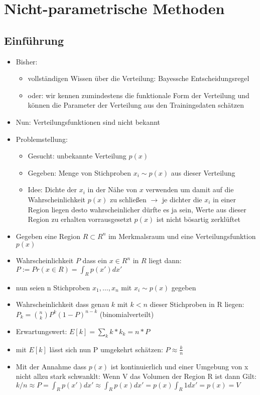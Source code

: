 \documentclass{article} %
\begin{document}
\section{Nicht-parametrische Methoden}
	\subsection{Einführung}
	\begin{itemize}
		\item Bisher:
		\begin{itemize}
			\item vollständigen Wissen über die Verteilung: Bayessche Entscheidungsregel
			\item oder: wir kennen zumindestens die funktionale Form der Verteilung und können die Parameter der Verteilung aus den Trainingsdaten schätzen
		\end{itemize}
		\item Nun: Verteilungsfunktionen sind nicht bekannt
		\item Problemstellung:
		\begin{itemize}
			\item Gesucht: unbekannte Verteilung $p(x)$
			\item Gegeben: Menge von Stichproben $x_i \sim p(x)$ aus dieser Verteilung
			\item Idee: Dichte der $x_i$ in der Nähe von $x$ verwenden um damit auf die Wahrscheinlichkeit $p(x)$ zu schließen $\rightarrow$ je dichter die $x_i$ in einer Region liegen desto wahrscheinlicher dürfte es ja sein, Werte aus dieser Region zu erhalten vorrausgesetzt $p(x)$ ist nicht bösartig zerklüftet
		\end{itemize}
		\item Gegeben eine Region $R \subset R^n$ im Merkmalsraum und eine Verteilungsfunktion $p(x)$
		\item Wahrscheinlichkeit $P$ dass ein $x \in R^n$ in $R$ liegt dann: $P := Pr(x\in R) = \int_R p(x') dx'$
		\item nun seien n Stichproben $x_1,\dots,x_n$ mit $x_i \sim p(x)$ gegeben
		\item Wahrscheinlichkeit dass genau $k$ mit $k<n$ dieser Stichproben in R liegen: $P_k = \binom{n}{k} P^k (1-P)^{n-k}$ (binomialverteilt)
		\item Erwartungswert: $E[k] = \sum_k k*k_k = n*P$
		\item mit $E[k]$ lässt sich nun P umgekehrt schätzen: $P \approx \frac{k}{n}$
		\item Mit der Annahme dass $p(x)$ ist kontinuierlich und einer Umgebung von x nicht allzu stark schwanklt: Wenn V das Volumen der Region R ist dann Gilt: $k/n \approx P = \int_R p(x')dx' \approx \int_R p(x)dx' = p(x)\int_R 1dx' = p(x) = V$

\end{itemize}
\end{document}
